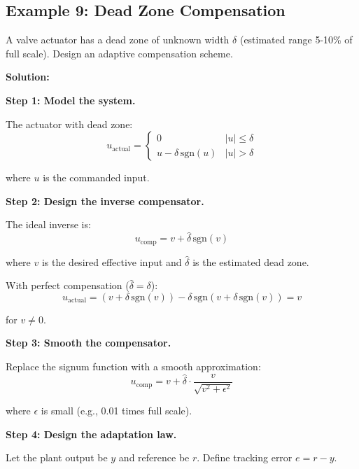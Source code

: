 \subsection{Example 9: Dead Zone Compensation}

\begin{example}
\label{ex:deadzone_compensation}
A valve actuator has a dead zone of unknown width $\delta$ (estimated range 5-10\% of full scale). Design an adaptive compensation scheme.

\textbf{Solution:}

\textbf{Step 1: Model the system.}

The actuator with dead zone:
\begin{equation}
u_{\text{actual}} = \begin{cases}
0 & |u| \leq \delta \\
u - \delta\,\text{sgn}(u) & |u| > \delta
\end{cases}
\end{equation}

where $u$ is the commanded input.

\textbf{Step 2: Design the inverse compensator.}

The ideal inverse is:
\begin{equation}
u_{\text{comp}} = v + \hat{\delta}\,\text{sgn}(v)
\end{equation}

where $v$ is the desired effective input and $\hat{\delta}$ is the estimated dead zone.

With perfect compensation ($\hat{\delta} = \delta$):
\begin{equation}
u_{\text{actual}} = (v + \delta\,\text{sgn}(v)) - \delta\,\text{sgn}(v + \delta\,\text{sgn}(v)) = v
\end{equation}

for $v \neq 0$.

\textbf{Step 3: Smooth the compensator.}

Replace the signum function with a smooth approximation:
\begin{equation}
u_{\text{comp}} = v + \hat{\delta} \cdot \frac{v}{\sqrt{v^2 + \epsilon^2}}
\end{equation}

where $\epsilon$ is small (e.g., 0.01 times full scale).

\textbf{Step 4: Design the adaptation law.}

Let the plant output be $y$ and reference be $r$. Define tracking error $e = r - y$.


\end{example}

